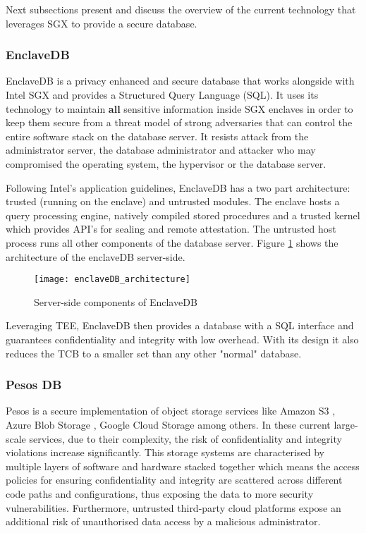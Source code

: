 Next subsections present and discuss the overview of the current technology that leverages \gls{SGX} to provide a secure database.

\subsubsection{EnclaveDB}
\label{sssec:enclave_db}

EnclaveDB \cite{enclavedb:1} is a privacy enhanced and secure database that works alongside with Intel \gls{SGX} and provides a Structured Query Language (SQL). It uses its technology to maintain \textbf{all} sensitive information inside \gls{SGX} enclaves in order to keep them secure from a threat model of strong adversaries that can control the entire software stack  on the database server. It resists attack from the administrator server, the database administrator and attacker who may compromised the operating system, the hypervisor or the database server.

Following Intel's application guidelines, EnclaveDB has a two part architecture: trusted (running on the enclave) and untrusted modules. The enclave hosts a query processing engine, natively compiled stored procedures and a trusted kernel which provides API's for sealing and remote attestation. The untrusted host process runs all other components of the database server. Figure \ref{fig:enclaveDB_architecture} shows the architecture of the enclaveDB server-side.

\begin{figure}[htbp]
	\centering
	{\texttt{[image: enclaveDB\_architecture]}}%
	\caption{Server-side components of EnclaveDB}
	\label{fig:enclaveDB_architecture}
\end{figure}

Leveraging \gls{TEE}, EnclaveDB then provides a database with a \gls{SQL} interface and guarantees confidentiality and integrity with low overhead. With its design it also reduces the \gls{TCB} to a smaller set than any other "normal" database.

\subsubsection{Pesos DB}
\label{sssec:pesos_db}

Pesos \cite{pesos:1} is a secure implementation of object storage services like Amazon S3 \cite{s3:1}, Azure Blob Storage \cite{azureStorage:1}, Google Cloud Storage \cite{googleStorage:1} among others. In these current large-scale services, due to their complexity, the risk of confidentiality and integrity violations increase significantly. This storage systems are characterised by multiple layers of software and hardware stacked together which means the access policies for ensuring confidentiality and integrity are scattered across different code paths and configurations, thus exposing the data to more security vulnerabilities. Furthermore, untrusted third-party cloud platforms expose an additional risk of unauthorised data access by a malicious administrator.

